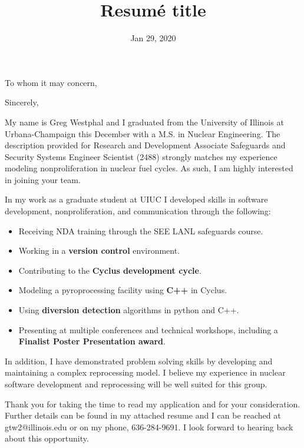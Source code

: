 \documentclass[11pt,a4paper,sans]{moderncv}        %
\title{Resumé title}                               %
\begin{document}
\vspace{2mm}
\hline
{}
\date{Jan 29, 2020}
\opening{To whom it may concern,}
\closing{Sincerely,}
\makelettertitle

My name is Greg Westphal and I graduated from the University of Illinois at 
Urbana-Champaign this December with a M.S. in Nuclear Engineering. The description provided for 
Research and Development Associate Safeguards and Security Systems Engineer Scientist (2488) strongly matches 
my experience modeling nonproliferation in nuclear fuel cycles. As such, I am highly interested in joining your team.

In my work as a graduate student at UIUC I developed skills in software development, nonproliferation, and communication through the following:
\vspace{2mm}
\begin{itemize}
	\item Receiving NDA training through the SEE LANL safeguards course.\vspace{2mm}
	\item Working in a \textbf{version control} environment.\vspace{2mm}
	\item Contributing to the \textbf{Cyclus development cycle}.\vspace{2mm}
	\item Modeling a pyroprocessing facility using \textbf{C++} in Cyclus.\vspace{2mm}
	\item Using \textbf{diversion detection} algorithms in python and C++.\vspace{2mm}
	\item Presenting at multiple conferences and technical workshops, including a \textbf{Finalist Poster
	Presentation award}.
\end{itemize}

In addition, I have demonstrated problem solving skills by developing and maintaining
a complex reprocessing model. 
I believe my experience in nuclear software development and reprocessing will be
well suited for this group. 

Thank you for taking the time to read my application and for your consideration.
Further details can be found in my attached resume and I can be reached at gtw2@illinois.edu
or on my phone, 636-284-9691. I look forward to hearing back about this opportunity.

\makeletterclosing
\end{document}
